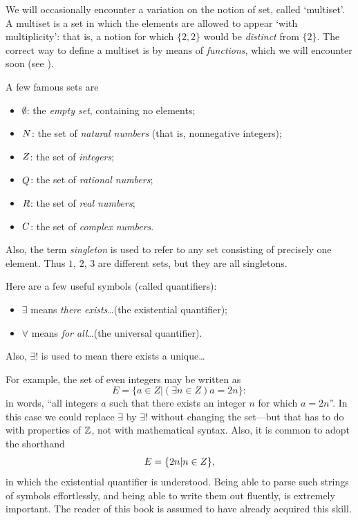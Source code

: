 We will occasionally encounter a variation on the notion of set,
called `multiset'.  A multiset is a set in which the elements are
allowed to appear `with multiplicity': that is, a notion for which
$\{2, 2\}$ would be \emph{distinct} from $\{2\}$. The correct way to
define a multiset is by means of \emph{functions}, which we will
encounter soon (see
).

A few famous sets are
\begin{itemize}
\item $\emptyset$: the \emph{empty set}, containing no elements;
\item $N$: the set of \emph{natural numbers} (that is, nonnegative
  integers);
\item $Z$: the set of \emph{integers};
\item $Q$: the set of \emph{rational numbers};
\item $R$: the set of \emph{real numbers};
\item $C$: the set of \emph{complex numbers}.
\end{itemize}
Also, the term \emph{singleton} is used to
refer to any set consisting of precisely one element. Thus ${1}$,
${2}$, ${3}$ are different sets, but they are all singletons.

Here are a few useful symbols (called quantifiers):
\begin{itemize}
\item $\exists$ means \emph{there exists}\ldots (the existential
  quantifier);
\item $\forall$ means \emph{for all}\ldots (the universal quantifier).
\end{itemize}
Also, $\exists!$ is used to mean there exists a
unique\ldots %

For example, the set of even integers may be written as
\[E = \{a \in Z | (\exists n \in Z) a = 2n\}:\] in words, ``all
integers $a$ such that there exists an integer $n$ for which
$a = 2n$''. In this case we could replace $\exists$ by
$\exists!$ %
without changing the set---but that has to do with properties of
$\mathbb{Z}$, not with mathematical syntax. Also, it is common to adopt
the shorthand
\[E = \{2n | n \in Z\},\] in which the existential quantifier is
understood.  Being able to parse such strings of symbols effortlessly,
and being able to write them out fluently, is extremely important. The
reader of this book is assumed to have already acquired this skill.

